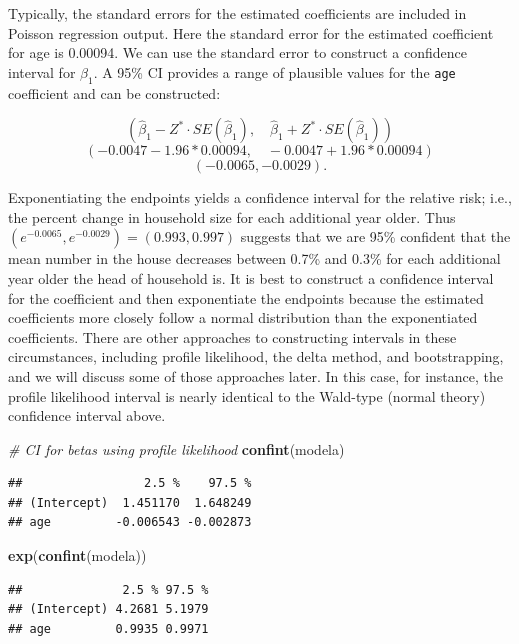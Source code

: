 \documentclass[
]{krantz}
\newenvironment{Shaded}{\begin{snugshade}}{\end{snugshade}}
\newcommand{\CommentTok}[1]{\textcolor[rgb]{0.37,0.37,0.37}{\textit{#1}}}
\newcommand{\FunctionTok}[1]{\textcolor[rgb]{0.27,0.27,0.27}{\textbf{#1}}}
\newcommand{\NormalTok}[1]{#1}
\begin{document}
Typically, the standard errors for the estimated coefficients are included in Poisson regression output. Here the standard error for the estimated coefficient for age is 0.00094. We can use the standard error to construct a confidence interval for \(\beta_1\). A 95\% CI provides a range of plausible values for the \texttt{age} coefficient and can be constructed:

\[(\hat\beta_1-Z^*\cdot SE(\hat\beta_1), \quad \hat\beta_1+Z^*\cdot SE(\hat\beta_1))\]
\[(-0.0047-1.96*0.00094, \quad -0.0047+1.96*0.00094)\]
\[ (-0.0065, -0.0029).
 \]

Exponentiating the endpoints yields a confidence interval for the relative risk; i.e., the percent change in household size for each additional year older. Thus \((e^{-0.0065},e^{-0.0029})=(0.993,0.997)\) suggests that we are 95\% confident that the mean number in the house decreases between 0.7\% and 0.3\% for each additional year older the head of household is. It is best to construct a confidence interval for the coefficient and then exponentiate the endpoints because the estimated coefficients more closely follow a normal distribution than the exponentiated coefficients. There are other approaches to constructing intervals in these circumstances, including profile likelihood, the delta method, and bootstrapping, and we will discuss some of those approaches later. In this case, for instance, the profile likelihood interval is nearly identical to the Wald-type (normal theory) confidence interval  above.

\begin{Shaded}
\begin{Highlighting}[]
\CommentTok{\# CI for betas using profile likelihood}
\FunctionTok{confint}\NormalTok{(modela)}
\end{Highlighting}
\end{Shaded}

\begin{verbatim}
##                 2.5 %    97.5 %
## (Intercept)  1.451170  1.648249
## age         -0.006543 -0.002873
\end{verbatim}

\begin{Shaded}
\begin{Highlighting}[]
\FunctionTok{exp}\NormalTok{(}\FunctionTok{confint}\NormalTok{(modela))}
\end{Highlighting}
\end{Shaded}

\begin{verbatim}
##              2.5 % 97.5 %
## (Intercept) 4.2681 5.1979
## age         0.9935 0.9971
\end{verbatim}
\end{document}
